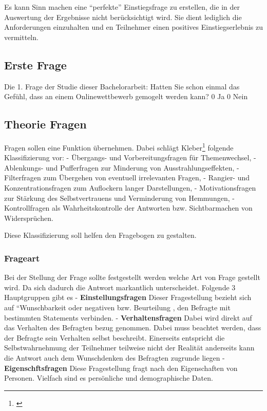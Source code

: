 Es kann Sinn machen eine ``perfekte'' Einstiegsfrage zu erstellen, die
in der Auswertung der Ergebnisse nicht berücksichtigt wird. Sie dient
lediglich die Anforderungen einzuhalten und en Teilnehmer einen
positives Einstiegserlebnis zu vermitteln.

\subsection{Erste Frage}\label{erste-frage}

Die 1. Frage der Studie dieser Bachelorarbeit: Hatten Sie schon einmal
das Gefühl, dass an einem Onlinewettbewerb gemogelt werden kann? 0 Ja 0
Nein

\subsection{Theorie Fragen}\label{theorie-fragen}

Fragen sollen eine Funktion übernehmen. Dabei schlägt Kleber\footnote{\autocite{kleber92}}
folgende Klassifizierung vor: - Übergangs- und Vorbereitungsfragen für
Themenwechsel, - Ablenkungs- und Pufferfragen zur Minderung von
Ausstrahlungseffekten, - Filterfragen zum Übergehen von eventuell
irrelevanten Fragen, - Rangier- und Konzentrationsfragen zum Auflockern
langer Darstellungen, - Motivationsfragen zur Stärkung des
Selbstvertrauens und Verminderung von Hemmungen, - Kontrollfragen als
Wahrheitskontrolle der Antworten bzw. Sichtbarmachen von Widersprüchen.

Diese Klassifizierung soll helfen den Fragebogen zu gestalten.

\subsubsection{Frageart}\label{frageart}

Bei der Stellung der Frage sollte festgestellt werden welche Art von
Frage gestellt wird. Da sich dadurch die Antwort markantlich
unterscheidet. Folgende 3 Hauptgruppen gibt es -
\textbf{Einstellungsfragen} Dieser Fragestellung bezieht sich auf
``Wunschbarkeit oder negativen bzw. Beurteilung , den Befragte mit
bestimmten Statements verbinden. - \textbf{Verhaltensfragen} Dabei wird
direkt auf das Verhalten des Befragten bezug genommen. Dabei muss
beachtet werden, dass der Befragte sein Verhalten selbst beschreibt.
Einerseits entspricht die Selbstwahrnehmung der Teilnehmer teilweise
nicht der Realität anderseits kann die Antwort auch dem Wunschdenken des
Befragten zugrunde liegen - \textbf{Eigenschftsfragen} Diese
Fragestellung fragt nach den Eigenschaften von Personen. Vielfach sind
es persönliche und demographische Daten.


